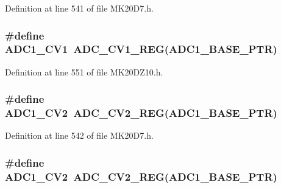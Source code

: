 Definition at line 541 of file M\+K20\+D7.\+h.

\subsubsection[{\texorpdfstring{A\+D\+C1\+\_\+\+C\+V1}{ADC1_CV1}}]{\setlength{\rightskip}{0pt plus 5cm}\#define A\+D\+C1\+\_\+\+C\+V1~{\bf A\+D\+C\+\_\+\+C\+V1\+\_\+\+R\+EG}({\bf A\+D\+C1\+\_\+\+B\+A\+S\+E\+\_\+\+P\+TR})}\hypertarget{group___a_d_c___register___accessor___macros_ga5d5808c8e9ad6257c8b3b10f18f764f2}{}\label{group___a_d_c___register___accessor___macros_ga5d5808c8e9ad6257c8b3b10f18f764f2}


Definition at line 551 of file M\+K20\+D\+Z10.\+h.

\subsubsection[{\texorpdfstring{A\+D\+C1\+\_\+\+C\+V2}{ADC1_CV2}}]{\setlength{\rightskip}{0pt plus 5cm}\#define A\+D\+C1\+\_\+\+C\+V2~{\bf A\+D\+C\+\_\+\+C\+V2\+\_\+\+R\+EG}({\bf A\+D\+C1\+\_\+\+B\+A\+S\+E\+\_\+\+P\+TR})}\hypertarget{group___a_d_c___register___accessor___macros_gabdfdeb322df796f7476878fd3aad8e53}{}\label{group___a_d_c___register___accessor___macros_gabdfdeb322df796f7476878fd3aad8e53}


Definition at line 542 of file M\+K20\+D7.\+h.

\subsubsection[{\texorpdfstring{A\+D\+C1\+\_\+\+C\+V2}{ADC1_CV2}}]{\setlength{\rightskip}{0pt plus 5cm}\#define A\+D\+C1\+\_\+\+C\+V2~{\bf A\+D\+C\+\_\+\+C\+V2\+\_\+\+R\+EG}({\bf A\+D\+C1\+\_\+\+B\+A\+S\+E\+\_\+\+P\+TR})}\hypertarget{group___a_d_c___register___accessor___macros_gabdfdeb322df796f7476878fd3aad8e53}{}\label{group___a_d_c___register___accessor___macros_gabdfdeb322df796f7476878fd3aad8e53}


